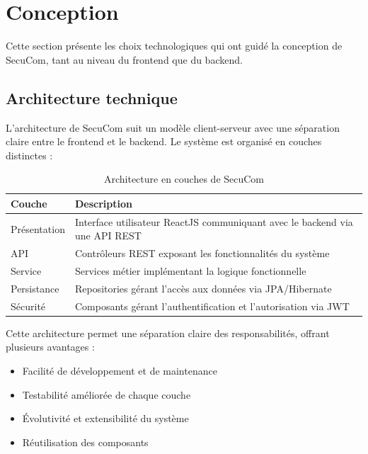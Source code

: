 \chapter{Conception}

Cette section présente les choix technologiques qui ont guidé la conception de SecuCom, tant au niveau du frontend que du backend.

\section{Architecture technique}

\noindent L'architecture de SecuCom suit un modèle client-serveur avec une séparation claire entre le frontend et le backend. Le système est organisé en couches distinctes :

\vspace{0.5cm}

\begin{table}[h]
\centering
\begin{tabular}{|l|p{10cm}|}
\hline
\textbf{Couche} & \textbf{Description} \\
\hline
Présentation & Interface utilisateur ReactJS communiquant avec le backend via une API REST \\
\hline
API & Contrôleurs REST exposant les fonctionnalités du système \\
\hline
Service & Services métier implémentant la logique fonctionnelle \\
\hline
Persistance & Repositories gérant l'accès aux données via JPA/Hibernate \\
\hline
Sécurité & Composants gérant l'authentification et l'autorisation via JWT \\
\hline
\end{tabular}
\caption{Architecture en couches de SecuCom}
\end{table}

\vspace{0.5cm}

\begin{tcolorbox}[
  title={\textbf{Avantages de l'architecture en couches}},
  colback=blue!5!white,
  colframe=primarycolor,
  fonttitle=\bfseries,
  boxrule=0.5mm,
  arc=2mm,
  left=6mm,
  right=6mm,
  top=6mm,
  bottom=6mm
]
Cette architecture permet une séparation claire des responsabilités, offrant plusieurs avantages :
\begin{itemize}[leftmargin=*,label=\textcolor{darkgray}{$\bullet$},itemsep=0.3em]
  \item Facilité de développement et de maintenance
  \item Testabilité améliorée de chaque couche
  \item Évolutivité et extensibilité du système
  \item Réutilisation des composants
\end{itemize}
\end{tcolorbox}

